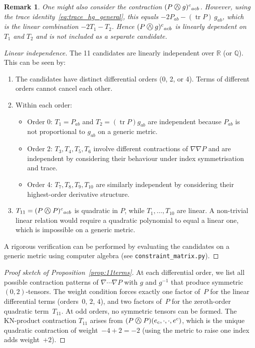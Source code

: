 \documentclass[11pt,a4paper]{article}
\newcommand{\owedge}{\mathbin{%
  \text{%
    \ooalign{%
      \hfil$\wedge$\hfil\cr
      \hfil\raisebox{0.05em}{$\bigcirc$}\hfil\cr
    }%
  }%
}}
\newtheorem{remark}[theorem]{Remark}
\begin{document}
\begin{remark}
One might also consider the contraction $(P \owedge g)^c{}_{acb}$.
However, using the trace identity~\eqref{eq:trace_hg_general},
this equals $-2P_{ab} - (\operatorname{tr}P)\,g_{ab}$,
which is the linear combination $-2T_1 - T_2$. Hence
$(P \owedge g)^c{}_{acb}$ is linearly dependent on $T_1$ and $T_2$
and is not included as a separate candidate.
\end{remark}

\begin{proof}[Linear independence]
The 11 candidates are linearly independent over $\mathbb{R}$ (or $\mathbb{Q}$).
This can be seen by:
\begin{enumerate}[label=(\alph*)]
  \item The candidates have distinct differential orders (0, 2, or 4).
    Terms of different orders cannot cancel each other.
  \item Within each order:
    \begin{itemize}
      \item Order 0: $T_1 = P_{ab}$ and $T_2 = (\operatorname{tr}P)g_{ab}$
        are independent because $P_{ab}$ is not proportional to $g_{ab}$
        on a generic metric.
      \item Order 2: $T_3, T_4, T_5, T_6$ involve different contractions
        of $\nabla\nabla P$ and are independent by considering their
        behaviour under index symmetrisation and trace.
      \item Order 4: $T_7, T_8, T_9, T_{10}$ are similarly independent
        by considering their highest-order derivative structure.
    \end{itemize}
  \item $T_{11} = (P\owedge P)^c{}_{acb}$ is quadratic in $P$, while
    $T_1,\ldots,T_{10}$ are linear. A non-trivial linear relation would
    require a quadratic polynomial to equal a linear one, which is
    impossible on a generic metric.
\end{enumerate}
A rigorous verification can be performed by evaluating the candidates
on a generic metric using computer algebra (see \texttt{constraint\_matrix.py}).
\end{proof}

\begin{proof}[Proof sketch of Proposition~\ref{prop:11terms}]
At each differential order, we list all possible contraction patterns of
$\nabla\cdots\nabla P$ with $g$ and $g^{-1}$ that produce symmetric
$(0,2)$-tensors. The weight condition forces exactly one factor of~$P$
for the linear differential terms (orders~$0$, $2$, $4$), and two factors
of~$P$ for the zeroth-order quadratic term~$T_{11}$.
At odd orders, no symmetric tensors can be formed.
The KN-product contraction $T_{11}$ arises from
$(P\owedge P)(e_c, \cdot, \cdot, e^c)$,
which is the unique quadratic contraction of weight~$-4+2 = -2$ (using
the metric to raise one index adds weight~$+2$).
\end{proof}
\end{document}
